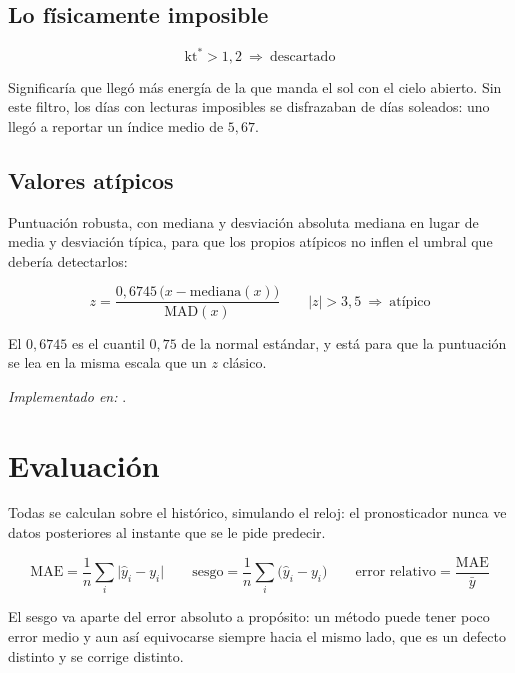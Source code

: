 \documentclass[11pt,a4paper]{article}
\begin{document}
\subsection{Lo físicamente imposible}

\begin{equation*}
  \mathrm{kt^*} > 1{,}2 \ \Longrightarrow\ \text{descartado}
\end{equation*}

Significaría que llegó más energía de la que manda el sol con el cielo abierto. Sin este
filtro, los días con lecturas imposibles se disfrazaban de días soleados: uno llegó a
reportar un índice medio de $5{,}67$.

\subsection{Valores atípicos}

Puntuación robusta, con mediana y desviación absoluta mediana en lugar de media y
desviación típica, para que los propios atípicos no inflen el umbral que debería
detectarlos:

\begin{equation*}
  z = \frac{0{,}6745\,\big(x - \mathrm{mediana}(x)\big)}{\mathrm{MAD}(x)}
  \qquad
  |z| > 3{,}5 \ \Longrightarrow\ \text{atípico}
\end{equation*}

El $0{,}6745$ es el cuantil $0{,}75$ de la normal estándar, y está para que la puntuación
se lea en la misma escala que un $z$ clásico.

\emph{Implementado en:} .

\section{Evaluación}

Todas se calculan sobre el histórico, simulando el reloj: el pronosticador nunca ve datos
posteriores al instante que se le pide predecir.

\begin{equation*}
  \mathrm{MAE} = \frac{1}{n}\sum_i \big| \hat{y}_i - y_i \big|
  \qquad
  \text{sesgo} = \frac{1}{n}\sum_i \big( \hat{y}_i - y_i \big)
  \qquad
  \text{error relativo} = \frac{\mathrm{MAE}}{\bar{y}}
\end{equation*}

El sesgo va aparte del error absoluto a propósito: un método puede tener poco error medio
y aun así equivocarse siempre hacia el mismo lado, que es un defecto distinto y se corrige
distinto.
\end{document}
